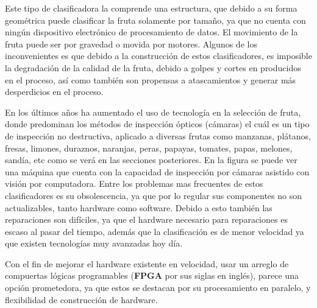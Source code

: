 \documentclass[twoside,spanish,ESP,MSc]{plantillaLabUPV}
\theoremstyle{definition}
\begin{document}

 Este tipo de clasificadora %
la comprende una estructura, que debido a su forma geométrica puede clasificar la fruta solamente por tamaño, ya que no cuenta con ningún dispositivo electrónico de procesamiento de datos. El movimiento de la fruta puede ser por gravedad o movida por motores. Algunos de los inconvenientes es que debido a la construcción de estos clasificadores, es imposible la degradación de la calidad de la fruta, debido a golpes y cortes en producidos en el proceso, así como también son propensas a atascamientos y generar más desperdicios en el proceso.



 En los últimos años ha aumentado el uso de tecnología en la selección de fruta, donde predominan los métodos de inspección ópticos (cámaras) el cuál es un tipo de inspección no destructiva, aplicado a diversas frutas como manzanas, plátanos, fresas, limones, duraznos, naranjas, peras, papayas, tomates, papas, melones, sandía, etc como se verá en las secciones posteriores. En la figura %
se puede ver una máquina que cuenta con la capacidad de inspección por cámaras asistido con visión por computadora. Entre los problemas mas frecuentes de estos clasificadores es su obsolescencia, ya que por lo regular sus componentes no son actualizables, tanto hardware como software. Debido a esto también las reparaciones son difíciles, ya que el hardware necesario para reparaciones es escaso al pasar del tiempo, además que la clasificación es de menor velocidad ya que existen tecnologías muy avanzadas hoy día.
	
	

Con el fin de mejorar el hardware existente en velocidad, usar un arreglo de compuertas lógicas programables (\textbf{FPGA} por sus siglas en inglés), parece una opción prometedora, ya que estos se destacan por su procesamiento en paralelo, y flexibilidad de construcción de hardware. 
\end{document}
